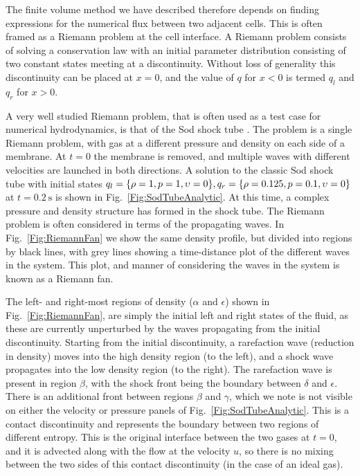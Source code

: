 The finite volume method we have described therefore depends on finding expressions for the numerical flux between two adjacent cells.
This is often framed as a Riemann problem at the cell interface.
A Riemann problem consists of solving a conservation law with an initial parameter distribution consisting of two constant states meeting at a discontinuity.
Without loss of generality this discontinuity can be placed at $x=0$, and the value of $q$ for $x<0$ is termed $q_l$ and $q_r$ for $x>0$.

A very well studied Riemann problem, that is often used as a test case for numerical hydrodynamics, is that of the Sod shock tube \citep{Sod1978}.
The problem is a single Riemann problem, with gas at a different pressure and density on each side of a membrane.
At $t=0$ the membrane is removed, and multiple waves with different velocities are launched in both directions.
A solution to the classic Sod shock tube with initial states $q_l = \{\rho=1, p=1, \upsilon=0\}, q_r = \{\rho=0.125, p=0.1, \upsilon=0\}$ at $t=\SI{0.2}{\second}$ is shown in Fig.~\ref{Fig:SodTubeAnalytic}.
At this time, a complex pressure and density structure has formed in the shock tube.
The Riemann problem is often considered in terms of the propagating waves.
In Fig.~\ref{Fig:RiemannFan} we show the same density profile, but divided into regions by black lines, with grey lines showing a time-distance plot of the different waves in the system.
This plot, and manner of considering the waves in the system is known as a Riemann fan.

The left- and right-most regions of density ($\alpha$ and $\epsilon$) shown in Fig.~\ref{Fig:RiemannFan}, are simply the initial left and right states of the fluid, as these are currently unperturbed by the waves propagating from the initial discontinuity.
Starting from the initial discontinuity, a rarefaction wave (reduction in density) moves into the high density region (to the left), and a shock wave propagates into the low density region (to the right).
The rarefaction wave is present in region $\beta$, with the shock front being the boundary between $\delta$ and $\epsilon$.
There is an additional front between regions $\beta$ and $\gamma$, which we note is not visible on either the velocity or pressure panels of Fig.~\ref{Fig:SodTubeAnalytic}.
This is a contact discontinuity and represents the boundary between two regions of different entropy.
This is the original interface between the two gases at $t=0$, and it is advected along with the flow at the velocity $u$, so there is no mixing between the two sides of this contact discontinuity (in the case of an ideal gas).

